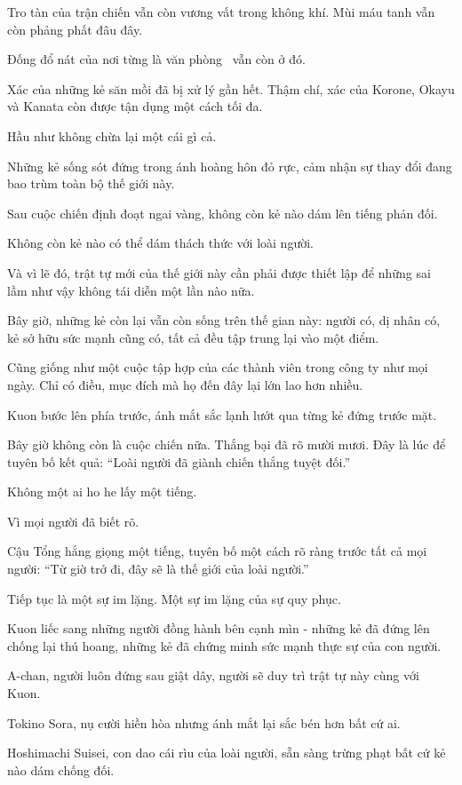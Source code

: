 \documentclass[../main.tex]{subfiles}
\begin{document}
Tro tàn của trận chiến vẫn còn vương vất trong không khí. Mùi máu tanh vẫn còn phảng phất đâu đây.

Đống đổ nát của nơi từng là văn phòng \hll\ vẫn còn ở đó.

Xác của những kẻ săn mồi đã bị xử lý gần hết. Thậm chí, xác của Korone, Okayu và Kanata còn được tận dụng một cách tối đa.

Hầu như không chừa lại một cái gì cả.

Những kẻ sống sót đứng trong ánh hoàng hôn đỏ rực, cảm nhận sự thay đổi đang bao trùm toàn bộ thế giới này.

Sau cuộc chiến định đoạt ngai vàng, không còn kẻ nào dám lên tiếng phản đối.

Không còn kẻ nào có thể dám thách thức với loài người.

Và vì lẽ đó, trật tự mới của thế giới này cần phải được thiết lập để những sai lầm như vậy không tái diễn một lần nào nữa.

Bây giờ, những kẻ còn lại vẫn còn sống trên thế gian này: người có, dị nhân có, kẻ sở hữu sức mạnh cũng có, tất cả đều tập trung lại vào một điểm.

Cũng giống như một cuộc tập hợp của các thành viên trong công ty như mọi ngày. Chỉ có điều, mục đích mà họ đến đây lại lớn lao hơn nhiều.

\il

Kuon bước lên phía trước, ánh mắt sắc lạnh lướt qua từng kẻ đứng trước mặt.

Bây giờ không còn là cuộc chiến nữa. Thắng bại đã rõ mười mươi. Đây là lúc để tuyên bố kết quả: ``Loài người đã giành chiến thắng tuyệt đối.''

Không một ai ho he lấy một tiếng.

Vì mọi người đã biết rõ.

Cậu Tổng hắng giọng một tiếng, tuyên bố một cách rõ ràng trước tất cả mọi người: ``Từ giờ trở đi, đây sẽ là thế giới của loài người.''

Tiếp tục là một sự im lặng. Một sự im lặng của sự quy phục.

Kuon liếc sang những người đồng hành bên cạnh mìn - những kẻ đã đứng lên chống lại thú hoang, những kẻ đã chứng minh sức mạnh thực sự của con người.

A-chan, người luôn đứng sau giật dây, người sẽ duy trì trật tự này cùng với Kuon.

Tokino Sora, nụ cười hiền hòa nhưng ánh mắt lại sắc bén hơn bất cứ ai.

Hoshimachi Suisei, con dao cái rìu của loài người, sẵn sàng trừng phạt bất cứ kẻ nào dám chống đối.
\end{document}
